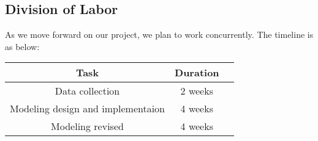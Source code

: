\documentclass{article}
\begin{document}
\begin{normalsize}
		\section{Division of Labor}
		As we move forward on our project, we plan to work concurrently. The timeline is as below:
		
		\begin{center}
			\begin{tabular}{ |c|c|c| } 
				\hline
				Task & Duration  \\ 
				\hline
				Data collection & 2 weeks \\ 
				Modeling design and implementaion & 4 weeks \\ 
				Modeling revised & 4 weeks \\ 
				\hline
			\end{tabular}
		\end{center}
		

		
		
		
	\end{normalsize}
	
\end{document}
